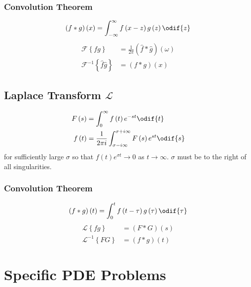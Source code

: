 \documentclass{article}
\begin{document}
\begin{multicols*}{3}
    \subsubsection{Convolution Theorem}
    \begin{equation*}
        \left( f \ast g \right)\left( x \right) = \int_{-\infty}^\infty f\left( x - z \right) g\left( z \right) \odif{z}
    \end{equation*}
    \begin{align*}
        \mathscr{F}\left\{ f g \right\}                  & = \frac{1}{2\pi} \left( \hat{f} \ast \hat{g} \right)\left( \omega \right) \\
        \mathscr{F}^{-1}\left\{ \hat{f} \hat{g} \right\} & = \left( f \ast g \right)\left( x \right)
    \end{align*}
    \subsection{Laplace Transform \texorpdfstring{\(\mathscr{L}\)}{L}}
    \begin{align*}
        F\left( s \right) & = \int_0^\infty f\left( t \right) e^{-st} \odif{t}                                                \\
        f\left( t \right) & = \frac{1}{2\pi i} \int_{\sigma - i \infty}^{\sigma + i \infty} F\left( s \right) e^{st} \odif{s}
    \end{align*}
    for sufficiently large \(\sigma\) so that \(f\left( t \right) e^{\sigma t} \to 0\) as \(t \to \infty\). \(\sigma\) must be to the right of all singularities.
    \subsubsection{Convolution Theorem}
    \begin{equation*}
        \left( f \ast g \right)\left( t \right) = \int_0^t f\left( t - \tau \right) g\left( \tau \right) \odif{\tau}
    \end{equation*}
    \begin{align*}
        \mathscr{L}\left\{ f g \right\}      & = \left( F \ast G \right)\left( s \right) \\
        \mathscr{L}^{-1}\left\{ F G \right\} & = \left( f \ast g \right)\left( t \right)
    \end{align*}
    \section{Specific PDE Problems}

\end{multicols*}
\end{document}
